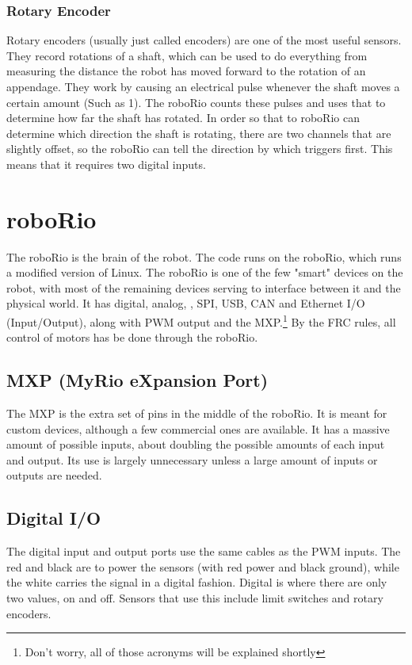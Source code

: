 \documentclass[]{report}
\begin{document}
	\subsubsection{Rotary Encoder}
		Rotary encoders (usually just called encoders) are one of the most useful sensors.
		They record rotations of a shaft, which can be used to do everything from measuring the distance the robot has moved forward to the rotation of an appendage.
		They work by causing an electrical pulse whenever the shaft moves a certain amount (Such as 1\textdegree).
		The roboRio counts these pulses and uses that to determine how far the shaft has rotated.
		In order so that to roboRio can determine which direction the shaft is rotating, there are two channels that are slightly offset, so the roboRio can tell the direction by which triggers first.
		This means that it requires two digital inputs.
\section{roboRio}
	The roboRio is the brain of the robot.
	The code runs on the roboRio, which runs a modified version of Linux.
	The roboRio is one of the few "smart" devices on the robot, with most of the remaining devices serving to interface between it and the physical world.
	It has digital, analog, \ITwoC, SPI, USB, CAN and Ethernet I/O (Input/Output), along with PWM output and the MXP.\footnote{Don't worry, all of those acronyms will be explained shortly}
	By the FRC rules, all control of motors has be done through the roboRio.
	
\subsection{MXP (MyRio eXpansion Port)}
	The MXP is the extra set of pins in the middle of the roboRio.
	It is meant for custom devices, although a few commercial ones are available.
	It has a massive amount of possible inputs, about doubling the possible amounts of each input and output.
	Its use is largely unnecessary unless a large amount of inputs or outputs are needed.

\subsection{Digital I/O}
	The digital input and output ports use the same cables as the PWM inputs.
	The red and black are to power the sensors (with red power and black ground), while the white carries the signal in a digital fashion.
	Digital is where there are only two values, on and off.
	Sensors that use this include limit switches and rotary encoders.
\end{document}
